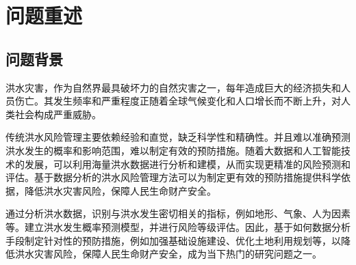 \documentclass[withoutpreface,bwprint]{cumcmthesis} %
\begin{document}
\begin{abstract}



\end{abstract}




\tableofcontents
\newpage
\section{问题重述}
\subsection{问题背景}
洪水灾害，作为自然界最具破坏力的自然灾害之一，每年造成巨大的经济损失和人员伤亡。其发生频率和严重程度正随着全球气候变化和人口增长而不断上升，对人类社会构成严重威胁。

传统洪水风险管理主要依赖经验和直觉，缺乏科学性和精确性。并且难以准确预测洪水发生的概率和影响范围，难以制定有效的预防措施。随着大数据和人工智能技术的发展，可以利用海量洪水数据进行分析和建模，从而实现更精准的风险预测和评估。基于数据分析的洪水风险管理方法可以为制定更有效的预防措施提供科学依据，降低洪水灾害风险，保障人民生命财产安全。

通过分析洪水数据，识别与洪水发生密切相关的指标，例如地形、气象、人为因素等。建立洪水发生概率预测模型，并进行风险等级评估。因此，基于如何数据分析手段制定针对性的预防措施，例如加强基础设施建设、优化土地利用规划等，以降低洪水灾害风险，保障人民生命财产安全，成为当下热门的研究问题之一。
\end{document}
